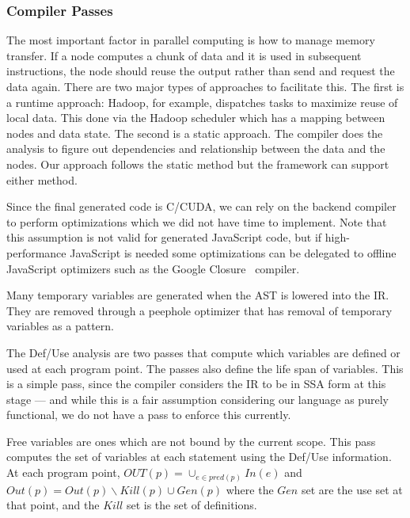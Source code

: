 \subsubsection{Compiler Passes}

The most important factor in parallel computing is how to manage memory
transfer. If a node computes a chunk of data and it is used in
subsequent instructions, the node should reuse the output rather than
send and request the data again. There are two major types of approaches to
facilitate
this. The first is a runtime approach: Hadoop, for example, dispatches
tasks to maximize reuse of local data. This done via the Hadoop
scheduler which has a mapping between nodes and data state.
The second is a static approach. The compiler does the analysis to figure out
dependencies and relationship between the data and the nodes. Our approach
follows the static method but the framework can support either method.
 
Since the final generated code is C/CUDA, we can rely on the backend compiler
	to perform optimizations which we did not have time
	to implement.
Note that this assumption is not valid for generated
	JavaScript code, but if high-performance JavaScript is needed
        some optimizations
	can be delegated to offline JavaScript optimizers such as the
	Google Closure~\cite{bolin2010closure} compiler.



Many temporary variables are generated when the AST is lowered into the IR.
They are removed through a peephole optimizer that has removal of
	temporary variables as a pattern.


The Def/Use analysis are two passes that compute which variables are defined
	or used at each program point.
The passes also define the life span of variables.
This is a simple pass, since the compiler considers the IR to be in SSA form
 	at this stage --- and while this is a fair assumption considering our
	language as purely functional, we do not have a pass to enforce this currently.


Free variables are ones which are not bound by the current scope.
This pass computes the set of variables at each statement using
	the Def/Use information.
At each program point, $OUT(p) = \cup_{e \in pred(p)} In(e)$ and $Out(p) = Out(p) \backslash Kill(p) \cup Gen(p)$
	where the $Gen$ set are the use set at that point, and the $Kill$ set is the set
 of definitions.

